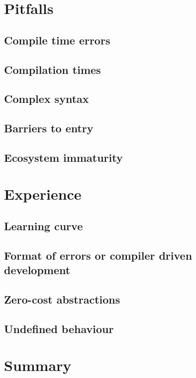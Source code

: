 \documentclass[%
final,
xcolor = table,
usenames,
dvipsnames,
table,
aspectratio = 169]{beamer}
\begin{document}
\section{Pitfalls}

\subsection{Compile time errors}


\subsection{Compilation times}


\subsection{Complex syntax}


\subsection{Barriers to entry}


\subsection{Ecosystem immaturity}


\section{Experience}

\subsection{Learning curve}


\subsection{Format of errors or compiler driven development}


\subsection{Zero-cost abstractions}


\subsection{Undefined behaviour}



\section{Summary}


\appendix




% 
\end{document}
